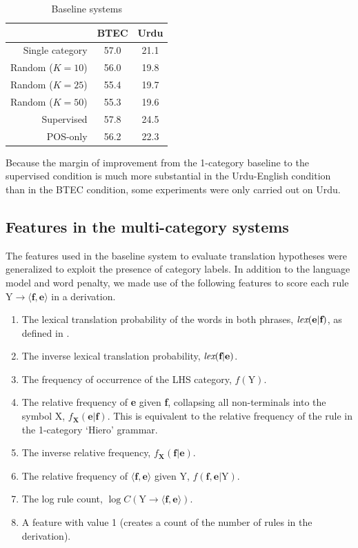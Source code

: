\begin{table}[h]
\caption{Baseline systems}
\begin{center}
\begin{tabular}{r|c|c}
& BTEC & Urdu \\
\hline
Single category \citep{chiang:2007} & 57.0 & 21.1 \\
\hline
Random ($K=10$) & 56.0 & 19.8 \\
Random ($K=25$) & 55.4 & 19.7 \\
Random ($K=50$) &  55.3 & 19.6 \\
\hline
Supervised \citep{samt} & 57.8 & 24.5 \\
POS-only & 56.2 & 22.3 \\
\end{tabular}
\end{center}
\label{tab:npbaselines}
\end{table}%

Because the margin of improvement from the 1-category baseline to the supervised condition is much more substantial in the Urdu-English condition than in the BTEC condition, some experiments were only carried out on Urdu.

\subsection{Features in the multi-category systems}

The features used in the baseline system to evaluate translation hypotheses were generalized to exploit the presence of category labels.  In addition to the language model and word penalty, we made use of the following features to score each rule $\textrm{Y} \rightarrow \langle \textbf{f},\textbf{e} \rangle$ in a derivation.

\begin{enumerate}
\item The lexical translation probability of the words in both phrases, $\textrm{{\emph lex}}(\textbf{e}|\textbf{f})$, as defined in \cite{Koehn2003}.
\item The inverse lexical translation probability, $\textrm{{\emph lex}}(\textbf{f}|\textbf{e})$.
\item The frequency of occurrence of the LHS category, $f(\textrm{Y})$.
\item The relative frequency of \textbf{e} given \textbf{f}, collapsing all non-terminals into the symbol X, $f_{\textbf{X}}(\textbf{e}|\textbf{f})$. This is equivalent to the relative frequency of the rule in the 1-category `Hiero' grammar.
\item The inverse relative frequency, $f_{\textbf{X}}(\textbf{f}|\textbf{e})$.
\item The relative frequency of $\langle \textbf{f}, \textbf{e} \rangle$ given Y, $f(\textbf{f}, \textbf{e} | \textrm{Y})$.
\item The log rule count, $\log C(\textrm{Y} \rightarrow \langle \textbf{f},\textbf{e} \rangle)$.
\item A feature with value 1 (creates a count of the number of rules in the derivation).
\end{enumerate}


